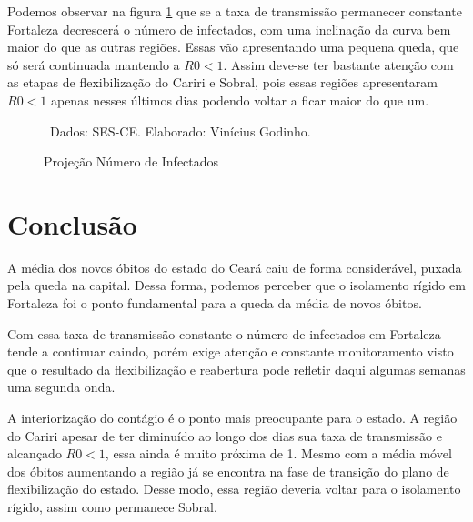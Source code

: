 \documentclass[a4paper,12pt,oneside,titlepage]{article}
\begin{document}
		
	
Podemos observar na figura \ref{g3} que se  a taxa de transmissão permanecer constante Fortaleza decrescerá o número de infectados, com uma inclinação da curva bem maior do que as outras regiões. Essas vão apresentando uma pequena queda, que só será continuada mantendo a $R0 < 1$. Assim deve-se ter bastante atenção com as etapas de flexibilização do Cariri e Sobral, pois essas regiões  apresentaram $R0 < 1$ apenas nesses últimos dias podendo voltar a ficar maior do que um.   	
	
	\begin{figure}[H]
		\centering
		\caption{Projeção Número de Infectados}
		
		\label{g3}
		\ \footnotesize Dados: SES-CE. Elaborado: Vinícius Godinho. 
		
	\end{figure}
	
	
\section{Conclusão}
	
A média dos novos óbitos do estado do Ceará caiu de forma considerável, puxada pela queda na capital. Dessa forma, podemos perceber  que o isolamento rígido em Fortaleza foi o ponto fundamental para a queda da média de novos óbitos.

Com essa taxa de transmissão constante o número de infectados em Fortaleza tende a continuar caindo, porém exige atenção e constante monitoramento visto que o resultado da flexibilização e reabertura pode refletir daqui algumas semanas uma segunda onda.

A interiorização do contágio é o ponto mais preocupante para o estado. A região do Cariri apesar de ter diminuído ao longo dos dias sua taxa de transmissão e alcançado $R0 < 1$, essa ainda é muito próxima de 1. Mesmo com a média móvel dos óbitos aumentando a região já se encontra na fase de transição do plano de flexibilização do estado. Desse modo, essa região deveria voltar para o isolamento rígido, assim como permanece Sobral. 
	
	
\end{document}
